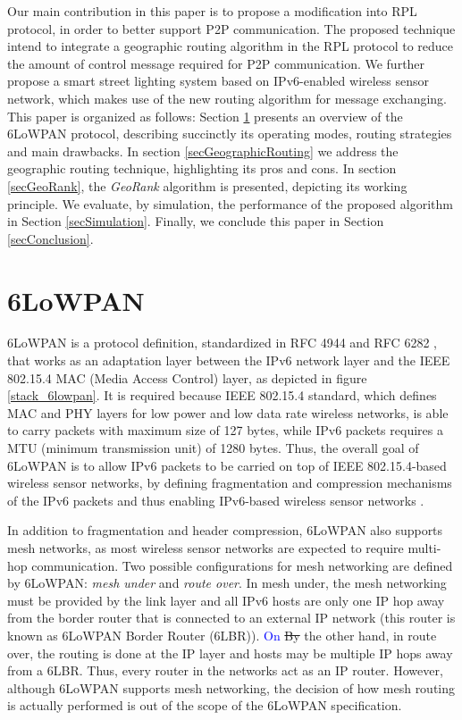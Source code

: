\documentclass[authoryear,preprint,review,12pt]{elsarticle}
\newcommand{\rev}{\textcolor{blue}}
\begin{document}
Our main contribution in this paper is to propose a modification into RPL protocol, in order to better support P2P communication. The proposed technique intend to integrate a geographic routing algorithm in the RPL protocol to reduce the amount of control message required for P2P communication. We further propose a smart street lighting system based on IPv6-enabled wireless sensor network, which makes use of the new routing algorithm for message exchanging. This paper is organized as follows: Section \ref{sec6LoWPAN} presents an overview of the 6LoWPAN protocol, describing succinctly its operating modes, routing strategies and main drawbacks. In section \ref{secGeographicRouting} we address the geographic routing technique, highlighting its pros and cons. In section \ref{secGeoRank}, the \textit{GeoRank} algorithm is presented, depicting its working principle. We evaluate, by simulation, the performance of the proposed algorithm in Section \ref{secSimulation}. Finally, we conclude this paper in Section \ref{secConclusion}.

\section{6LoWPAN}
\label{sec6LoWPAN}

6LoWPAN is a protocol definition, standardized in RFC 4944 \citep{RFC4944} and RFC 6282 \citep{RFC6282}, that works as an adaptation layer between the IPv6 network layer and the IEEE 802.15.4 MAC (Media Access Control) layer, as depicted in figure \ref{stack_6lowpan}. It is required because IEEE 802.15.4 standard, which defines MAC and PHY layers for low power and low data rate wireless networks, is able to carry packets with maximum size of 127 bytes, while IPv6 packets requires a MTU (minimum transmission unit) of 1280 bytes. Thus, the overall goal of 6LoWPAN is to allow IPv6 packets to be carried on top of IEEE 802.15.4-based wireless sensor networks, by defining fragmentation and compression mechanisms of the IPv6 packets and thus enabling IPv6-based wireless sensor networks \citep{Mulligan_6LoWPAN_2007}.

In addition to fragmentation and header compression, 6LoWPAN also supports mesh networks, as most wireless sensor networks are expected to require multi-hop communication. Two possible configurations for mesh networking are defined by 6LoWPAN: \textit{mesh under} and \textit{route over}. In mesh under, the mesh networking must be provided by the link layer and all IPv6 hosts are only one IP hop away from the border router that is connected to an external IP network (this router is known as 6LoWPAN Border Router (6LBR)). \rev{On} \sout{By} the other hand, in route over, the routing is done at the IP layer and hosts may be multiple IP hops away from a 6LBR. Thus, every router in the networks act as an IP router. However, although 6LoWPAN supports mesh networking, the decision of how mesh routing is actually performed is out of the scope of the 6LoWPAN specification.
\end{document}
